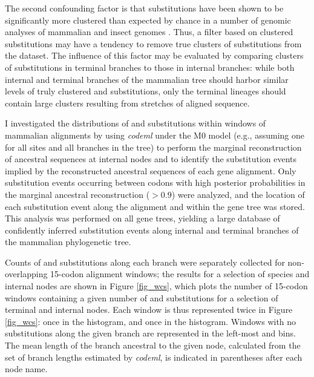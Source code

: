 The second confounding factor is that \nsyn substitutions have been
shown to be significantly more clustered than expected by chance in a
number of genomic analyses of mammalian and insect genomes
\citep{Callahan2011,Bazykin2004,Wang2007}. Thus, a filter based on
clustered \nsyn substitutions may have a tendency to remove true
clusters of \nsyn substitutions from the dataset. The influence of
this factor may be evaluated by comparing clusters of substitutions in
terminal branches to those in internal branches: while both internal
and terminal branches of the mammalian tree should harbor similar
levels of truly clustered \nsyn and \syn substitutions, only the
terminal lineages should contain large clusters resulting from
stretches of aligned \nhom sequence.

I investigated the distributions of \nsyn and \syn substitutions
within windows of mammalian alignments by using \emph{codeml}
\citep{Yang2007} under the M0 model (e.g., assuming one \omg for
all sites and all branches in the tree) to perform the marginal
reconstruction of ancestral sequences at internal nodes
\citep{Yang1995} and to identify the substitution events implied by
the reconstructed ancestral sequences of each gene alignment. Only
substitution events occurring between codons with high posterior
probabilities in the marginal ancestral reconstruction ($>0.9$) were
analyzed, and the location of each substitution event along the
alignment and within the gene tree was stored. This analysis was
performed on all gene trees, yielding a large database of confidently
inferred substitution events along internal and terminal branches of
the mammalian phylogenetic tree.

Counts of \syn and \nsyn substitutions along each branch were
separately collected for non-overlapping 15-codon alignment windows;
the results for a selection of species and internal nodes are shown in
Figure \ref{fig_wcs}, which plots the number of 15-codon windows
containing a given number of \nsyn and \syn substitutions for a
selection of terminal and internal nodes. Each window is thus
represented twice in Figure \ref{fig_wcs}: once in the \nsyn
histogram, and once in the \syn histogram. Windows with no
substitutions along the given branch are represented in the left-most
\syn and \nsyn bins. The mean length of the branch ancestral to the
given node, calculated from the set of branch lengths estimated by
\emph{codeml}, is indicated in parentheses after each node name.

